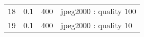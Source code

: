 \begin{table}[htpb]
\begin{tabular}{l|lll}
18      & 0.1                                                                                                      & 400                                                                                          & jpeg2000 : quality 100  \\
19      & 0.1                                                                                                      & 400                                                                                          & jpeg2000 : quality 10  
\end{tabular}
\end{table}